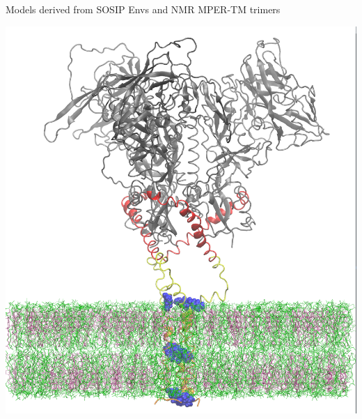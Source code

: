 \begin{frame}[fragile]{Models derived from SOSIP Envs and NMR MPER-TM trimers}
\begin{center}
\begin{minipage}{0.47\textwidth}
\begin{center}
                \includegraphics[width=\textwidth]{5vn3-mper-tm-update-1.png}
            \end{center}
        \end{minipage}
    \end{center}
\end{frame}

